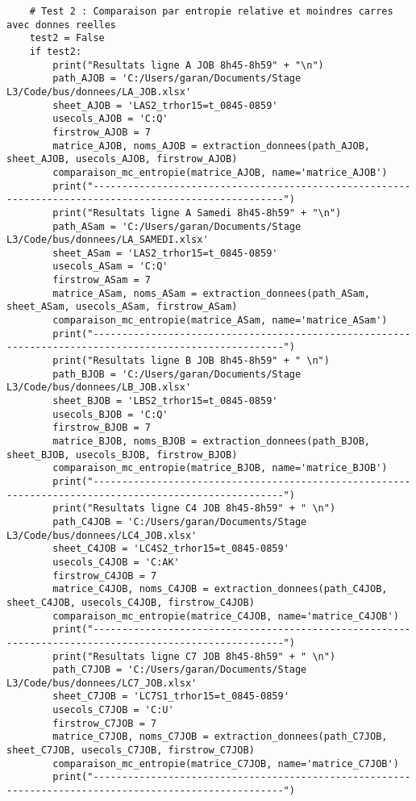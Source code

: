 \documentclass[12pt]{article}
\begin{document}
\begin{lstlisting}
    # Test 2 : Comparaison par entropie relative et moindres carres avec donnes reelles
    test2 = False
    if test2:
        print("Resultats ligne A JOB 8h45-8h59" + "\n")
        path_AJOB = 'C:/Users/garan/Documents/Stage L3/Code/bus/donnees/LA_JOB.xlsx'
        sheet_AJOB = 'LAS2_trhor15=t_0845-0859'
        usecols_AJOB = 'C:Q'
        firstrow_AJOB = 7
        matrice_AJOB, noms_AJOB = extraction_donnees(path_AJOB, sheet_AJOB, usecols_AJOB, firstrow_AJOB)
        comparaison_mc_entropie(matrice_AJOB, name='matrice_AJOB')
        print("-------------------------------------------------------------------------------------------------------")
        print("Resultats ligne A Samedi 8h45-8h59" + "\n")
        path_ASam = 'C:/Users/garan/Documents/Stage L3/Code/bus/donnees/LA_SAMEDI.xlsx'
        sheet_ASam = 'LAS2_trhor15=t_0845-0859'
        usecols_ASam = 'C:Q'
        firstrow_ASam = 7
        matrice_ASam, noms_ASam = extraction_donnees(path_ASam, sheet_ASam, usecols_ASam, firstrow_ASam)
        comparaison_mc_entropie(matrice_ASam, name='matrice_ASam')
        print("-------------------------------------------------------------------------------------------------------")
        print("Resultats ligne B JOB 8h45-8h59" + " \n")
        path_BJOB = 'C:/Users/garan/Documents/Stage L3/Code/bus/donnees/LB_JOB.xlsx'
        sheet_BJOB = 'LBS2_trhor15=t_0845-0859'
        usecols_BJOB = 'C:Q'
        firstrow_BJOB = 7
        matrice_BJOB, noms_BJOB = extraction_donnees(path_BJOB, sheet_BJOB, usecols_BJOB, firstrow_BJOB)
        comparaison_mc_entropie(matrice_BJOB, name='matrice_BJOB')
        print("-------------------------------------------------------------------------------------------------------")
        print("Resultats ligne C4 JOB 8h45-8h59" + " \n")
        path_C4JOB = 'C:/Users/garan/Documents/Stage L3/Code/bus/donnees/LC4_JOB.xlsx'
        sheet_C4JOB = 'LC4S2_trhor15=t_0845-0859'
        usecols_C4JOB = 'C:AK'
        firstrow_C4JOB = 7
        matrice_C4JOB, noms_C4JOB = extraction_donnees(path_C4JOB, sheet_C4JOB, usecols_C4JOB, firstrow_C4JOB)
        comparaison_mc_entropie(matrice_C4JOB, name='matrice_C4JOB')
        print("-------------------------------------------------------------------------------------------------------")
        print("Resultats ligne C7 JOB 8h45-8h59" + " \n")
        path_C7JOB = 'C:/Users/garan/Documents/Stage L3/Code/bus/donnees/LC7_JOB.xlsx'
        sheet_C7JOB = 'LC7S1_trhor15=t_0845-0859'
        usecols_C7JOB = 'C:U'
        firstrow_C7JOB = 7
        matrice_C7JOB, noms_C7JOB = extraction_donnees(path_C7JOB, sheet_C7JOB, usecols_C7JOB, firstrow_C7JOB)
        comparaison_mc_entropie(matrice_C7JOB, name='matrice_C7JOB')
        print("-------------------------------------------------------------------------------------------------------")
\end{lstlisting}
\end{document}
